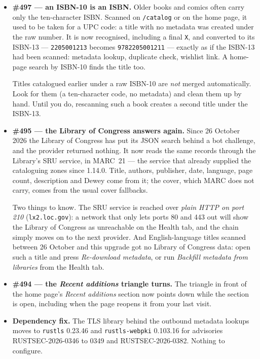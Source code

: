 \begin{itemize}
  \item \textbf{\#497 \string— an ISBN-10 is an ISBN.} Older books and
        comics often carry only the ten-character ISBN. Scanned on
        \texttt{/catalog} or on the home page, it used to be taken for
        a UPC code: a title with no metadata was created under the raw
        number. It is now recognised, including a final \texttt{X},
        and converted to its ISBN-13 --- \texttt{2205001213} becomes
        \texttt{9782205001211} --- exactly as if the ISBN-13 had been
        scanned: metadata lookup, duplicate check, wishlist link. A
        home-page search by ISBN-10 finds the title too.

        Titles catalogued earlier under a raw ISBN-10 are \emph{not}
        merged automatically. Look for them (a ten-character code, no
        metadata) and clean them up by hand. Until you do, rescanning
        such a book creates a second title under the ISBN-13.
  \item \textbf{\#495 \string— the Library of Congress answers again.}
        Since 26 October 2026 the Library of Congress has put its JSON
        search behind a bot challenge, and the provider returned
        nothing. It now reads the same records through the Library's
        SRU service, in MARC~21 --- the service that already supplied
        the cataloguing zones since 1.14.0. Title, authors, publisher,
        date, language, page count, description and Dewey come from
        it; the cover, which MARC does not carry, comes from the usual
        cover fallbacks.

        Two things to know. The SRU service is reached over
        \emph{plain HTTP on port 210} (\texttt{lx2.loc.gov}): a network
        that only lets ports 80 and 443 out will show the Library of
        Congress as unreachable on the Health tab, and the chain simply
        moves on to the next provider. And English-language titles
        scanned between 26 October and this upgrade got no Library of
        Congress data: open such a title and press \emph{Re-download
        metadata}, or run \emph{Backfill metadata from libraries} from
        the Health tab.
  \item \textbf{\#494 \string— the \emph{Recent additions} triangle
        turns.} The triangle in front of the home page's \emph{Recent
        additions} section now points down while the section is open,
        including when the page reopens it from your last visit.
  \item \textbf{Dependency fix.} The TLS library behind the outbound
        metadata lookups moves to \texttt{rustls} 0.23.46 and
        \texttt{rustls-webpki} 0.103.16 for advisories
        RUSTSEC-2026-0346 to 0349 and RUSTSEC-2026-0382. Nothing to
        configure.
\end{itemize}

